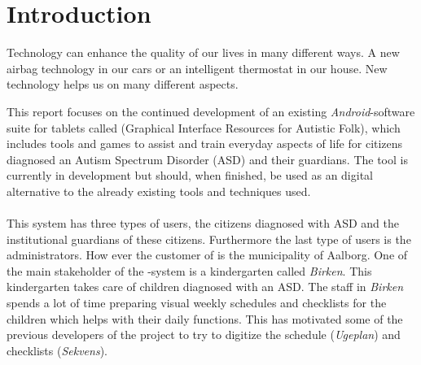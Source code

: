 \chapter{Introduction}
\label{cha:introduction}

Technology can enhance the quality of our lives in many different ways. A new airbag technology in our cars or an intelligent thermostat in our house. New technology helps us on many different aspects. 

This report focuses on the continued development of an existing \emph{Android}-software suite for tablets called \giraf (Graphical Interface Resources for Autistic Folk), which includes tools and games to assist and train everyday aspects of life for citizens diagnosed an Autism Spectrum Disorder (ASD) \parencite{asd} and their guardians. The tool is currently in development but should, when finished, be used as an digital alternative to the already existing tools and techniques used. 
\\\\
This system has three types of users, the citizens diagnosed with ASD and the institutional guardians of these citizens. Furthermore the last type of users is the administrators. How ever the customer of \giraf is the municipality of Aalborg.
One of the main stakeholder of the \giraf-system is a kindergarten called \emph{Birken}. This kindergarten takes care of children diagnosed with an ASD. The staff in \emph{Birken} spends a lot of time preparing visual weekly schedules and checklists for the children which helps with their daily functions. This has motivated some of the previous developers of the \giraf project to try to digitize the schedule (\emph{Ugeplan}) and checklists (\emph{Sekvens}). 
\\\\



